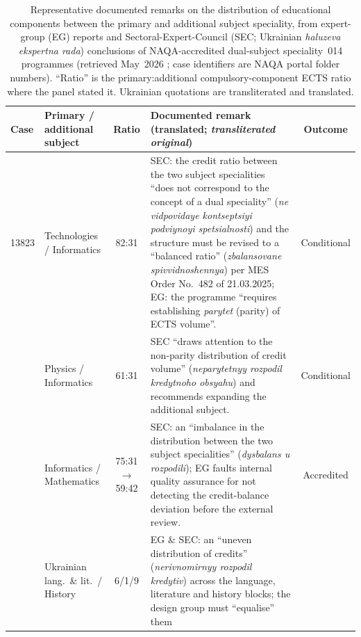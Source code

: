 \begin{table}[!t]
  \centering
  \caption{Representative documented remarks on the distribution of educational components between the
  primary and additional subject speciality, from expert-group (EG) reports and Sectoral-Expert-Council
  (SEC; Ukrainian \textit{haluzeva ekspertna rada}) conclusions of NAQA-accredited dual-subject
  speciality~014 programmes (retrieved May~2026 \citep{NAQA:Portal2026}; case identifiers are NAQA
  portal folder numbers). ``Ratio'' is the primary:additional compulsory-component ECTS ratio where the
  panel stated it. Ukrainian quotations are transliterated and translated.}
  \label{tab:accred-examples}
  \footnotesize
  \begin{tabular}{@{}llcp{8.2cm}c@{}}
    \toprule
    Case & Primary / additional subject & Ratio & Documented remark (translated; \textit{transliterated original}) & Outcome \\
    \midrule
    13823 & Technologies / Informatics & 82:31 &
    SEC: the credit ratio between the two subject specialities ``does not correspond to the concept of a
    dual speciality'' (\textit{ne vidpovidaye kontseptsiyi podviynoyi spetsialnosti}) and the structure
    must be revised to a ``balanced ratio'' (\textit{zbalansovane spivvidnoshennya}) per MES Order
    No.~482 of 21.03.2025; EG: the programme ``requires establishing \textit{parytet} (parity) of ECTS
    volume''. & Conditional \\
    \addlinespace
    13755 & Physics / Informatics & 61:31 &
    SEC ``draws attention to the non-parity distribution of credit volume''
    (\textit{neparytetnyy rozpodil kredytnoho obsyahu}) and recommends expanding the additional subject. & Conditional \\
    \addlinespace
    15783 & Informatics / Mathematics & 75:31$\rightarrow$59:42 &
    SEC: an ``imbalance in the distribution between the two subject specialities'' (\textit{dysbalans u
    rozpodili}); EG faults internal quality assurance for not detecting the credit-balance deviation
    before the external review. & Accredited \\
    \addlinespace
    12237 & Ukrainian lang.\ \& lit.\ / History & 6/1/9 &
    EG \& SEC: an ``uneven distribution of credits'' (\textit{nerivnomirnyy rozpodil kredytiv}) across the
    language, literature and history blocks; the design group must ``equalise'' them

\end{tabular}
\end{table}
